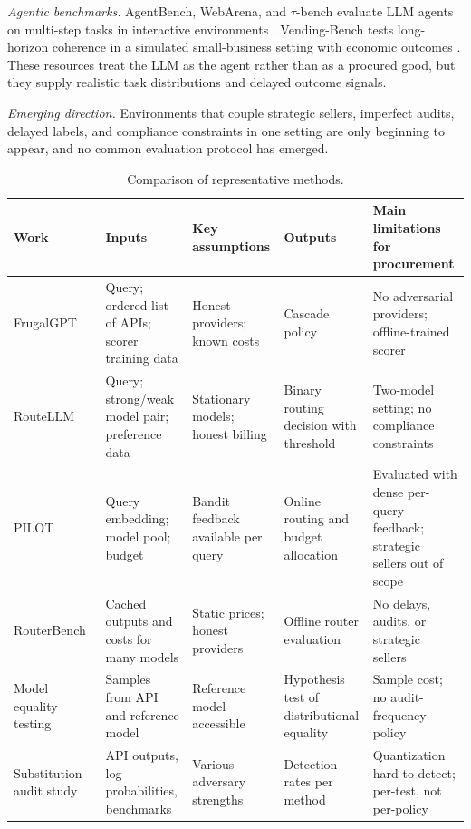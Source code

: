 \documentclass[sigconf]{acmart}
\begin{document}
\emph{Agentic benchmarks.} AgentBench, WebArena, and $\tau$-bench evaluate LLM agents on multi-step tasks in interactive environments \cite{liu2024agentbench, zhou2024webarena, yao2024taubench}. Vending-Bench tests long-horizon coherence in a simulated small-business setting with economic outcomes \cite{backlund2025vending}. These resources treat the LLM as the agent rather than as a procured good, but they supply realistic task distributions and delayed outcome signals.

\emph{Emerging direction.} Environments that couple strategic sellers, imperfect audits, delayed labels, and compliance constraints in one setting are only beginning to appear, and no common evaluation protocol has emerged.


\begin{table}[t]
  \caption{Comparison of representative methods.}
  \label{tab:comparison}
  \centering
  \footnotesize
  \begin{tabular}{p{}p{}p{}p{}p{}}
    \toprule
    Work & Inputs & Key assumptions & Outputs & Main limitations for procurement \\
    \midrule
    FrugalGPT~\cite{chen2023frugalgpt} & Query; ordered list of APIs; scorer training data & Honest providers; known costs & Cascade policy & No adversarial providers; offline-trained scorer \\
    RouteLLM~\cite{ong2025routellm} & Query; strong/weak model pair; preference data & Stationary models; honest billing & Binary routing decision with threshold & Two-model setting; no compliance constraints \\
    PILOT~\cite{panda2025pilot} & Query embedding; model pool; budget & Bandit feedback available per query & Online routing and budget allocation & Evaluated with dense per-query feedback; strategic sellers out of scope \\
    RouterBench~\cite{hu2024routerbench} & Cached outputs and costs for many models & Static prices; honest providers & Offline router evaluation & No delays, audits, or strategic sellers \\
    Model equality testing~\cite{gao2025equality} & Samples from API and reference model & Reference model accessible & Hypothesis test of distributional equality & Sample cost; no audit-frequency policy \\
    Substitution audit study~\cite{cai2025substitution} & API outputs, log-probabilities, benchmarks & Various adversary strengths & Detection rates per method & Quantization hard to detect; per-test, not per-policy \\

\end{tabular}
\end{table}
\end{document}
